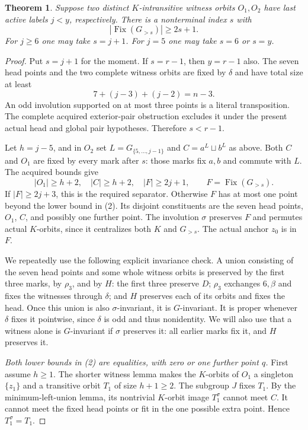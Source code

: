 \documentclass[11pt,a4paper]{article}
\newtheorem{theorem}[lemma]{Theorem}
\begin{document}
\begin{theorem}
Suppose two distinct $K$-intransitive witness
orbits $O_1,O_2$ have last active labels $j<y$,
respectively. There is a nonterminal index $s$
with
\[
                 |\operatorname{Fix}(G_{>s})|\ge2s+1.
\]
For $j\ge6$ one may take $s=j+1$. For $j=5$
one may take $s=6$ or $s=y$.
\end{theorem}
\begin{proof}
Put $s=j+1$ for the moment. If $s=r-1$, then
$y=r-1$ also. The seven head points and the two
complete witness orbits are fixed by $\delta$
and have total size at least
\[
                   7+(j-3)+(j-2)=n-3.
\]
An odd involution supported on at most three
points is a literal transposition. The complete
acquired exterior-pair obstruction excludes it
under the present actual head and global pair
hypotheses. Therefore $s<r-1$.

Let $h=j-5$, and in $O_2$ set $L=G_{\{5,\ldots,j-1\}}$
and $C=a^L\sqcup b^L$ as above. Both $C$ and
$O_1$ are fixed by every mark after $s$: those
marks fix $a,b$ and commute with $L$.
The acquired bounds give
\[
 |O_1|\ge h+2,\quad |C|\ge h+2,\quad
 |F|\ge2j+1,\qquad F=\operatorname{Fix}(G_{>s}).
                                                        \tag{2}
\]
If $|F|\ge2j+3$, this is the required separator.
Otherwise $F$ has at most one point beyond the
lower bound in (2). Its disjoint constituents
are the seven head points, $O_1$, $C$, and
possibly one further point. The involution
$\sigma$ preserves $F$ and permutes actual
$K$-orbits, since it centralizes both $K$ and
$G_{>s}$. The actual anchor $z_0$ is in $F$.

We repeatedly use the following explicit invariance
check. A union consisting of the seven head
points and some whole witness orbits is preserved
by the first three marks, by $\rho_3$, and by
$H$: the first three preserve $D$; $\rho_3$
exchanges $6,\beta$ and fixes the witnesses
through $\delta$; and $H$ preserves each of its
orbits and fixes the head. Once this union is
also $\sigma$-invariant, it is $G$-invariant.
It is proper whenever $\delta$ fixes it pointwise,
since $\delta$ is odd and thus nonidentity.
We will also use that a witness alone is
$G$-invariant if $\sigma$ preserves it: all
earlier marks fix it, and $H$ preserves it.

\emph{Both lower bounds in (2) are equalities, with
zero or one further point $q$.}
First assume $h\ge1$. The shorter witness lemma
makes the $K$-orbits of $O_1$ a singleton
$\{z_1\}$ and a transitive orbit $T_1$ of
size $h+1\ge2$. The subgroup $J$ fixes $T_1$.
By the minimum-left-union lemma, its nontrivial
$K$-orbit image $T_1^\sigma$ cannot meet $C$.
It cannot meet the fixed head points or fit in
the one possible extra point. Hence
$T_1^\sigma=T_1$.


\end{proof}
\end{document}
